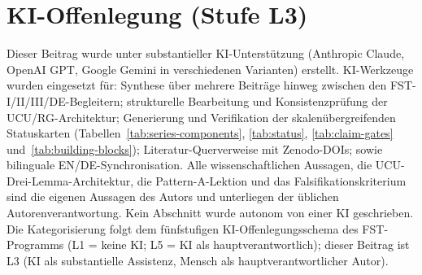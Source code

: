 \documentclass[11pt,a4paper]{article}
\theoremstyle{remark}
\begin{document}
\section*{KI-Offenlegung (Stufe L3)}
Dieser Beitrag wurde unter substantieller KI-Unterstützung (Anthropic Claude, OpenAI GPT, Google Gemini in verschiedenen Varianten) erstellt. KI-Werkzeuge wurden eingesetzt für: Synthese über mehrere Beiträge hinweg zwischen den FST-I/II/III/DE-Begleitern; strukturelle Bearbeitung und Konsistenzprüfung der UCU/RG-Architektur; Generierung und Verifikation der skalenübergreifenden Statuskarten (Tabellen~\ref{tab:series-components}, \ref{tab:status}, \ref{tab:claim-gates} und~\ref{tab:building-blocks}); Literatur-Querverweise mit Zenodo-DOIs; sowie bilinguale EN/DE-Synchronisation. Alle wissenschaftlichen Aussagen, die UCU-Drei-Lemma-Architektur, die Pattern-A-Lektion und das Falsifikationskriterium sind die eigenen Aussagen des Autors und unterliegen der üblichen Autorenverantwortung. Kein Abschnitt wurde autonom von einer KI geschrieben. Die Kategorisierung folgt dem fünfstufigen KI-Offenlegungsschema des FST-Programms (L1 = keine KI; L5 = KI als hauptverantwortlich); dieser Beitrag ist L3 (KI als substantielle Assistenz, Mensch als hauptverantwortlicher Autor).
\end{document}
